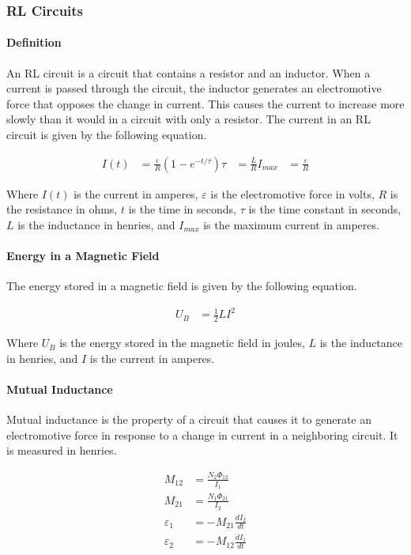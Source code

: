 \subsubsection*{RL Circuits}
\paragraph*{Definition}
An RL circuit is a circuit that contains a resistor and an inductor. When a current is passed through the circuit, the inductor generates
an electromotive force that opposes the change in current. This causes the current to increase more slowly than it would in a circuit with
only a resistor. The current in an RL circuit is given by the following equation.

\begin{align*}
    I(t) &= \frac{\varepsilon}{R}(1 - e^{-t/\tau})
    \tau &= \frac{L}{R}
    I_{max} &= \frac{\varepsilon}{R} 
\end{align*}

Where $I(t)$ is the current in amperes, $\varepsilon$ is the electromotive force in volts, $R$ is the resistance in ohms, $t$ is the time in seconds,
$\tau$ is the time constant in seconds, $L$ is the inductance in henries, and $I_{max}$ is the maximum current in amperes.\\

\paragraph*{Energy in a Magnetic Field}
The energy stored in a magnetic field is given by the following equation.

\begin{align*}
    U_B &= \frac{1}{2}LI^2
\end{align*}

Where $U_B$ is the energy stored in the magnetic field in joules, $L$ is the inductance in henries, and $I$ is the current in amperes.\\

\paragraph*{Mutual Inductance}
Mutual inductance is the property of a circuit that causes it to generate an electromotive force in response to a change in current in a
neighboring circuit. It is measured in henries. 

\begin{align*}
    M_{12} &= \frac{N_2\Phi_12}{I_1}\\
    M_{21} &= \frac{N_1\Phi_21}{I_2}\\
    \varepsilon_1 &= -M_{21}\frac{dI_2}{dt}\\
    \varepsilon_2 &= -M_{12} \frac{dI_1}{dt}
\end{align*}
